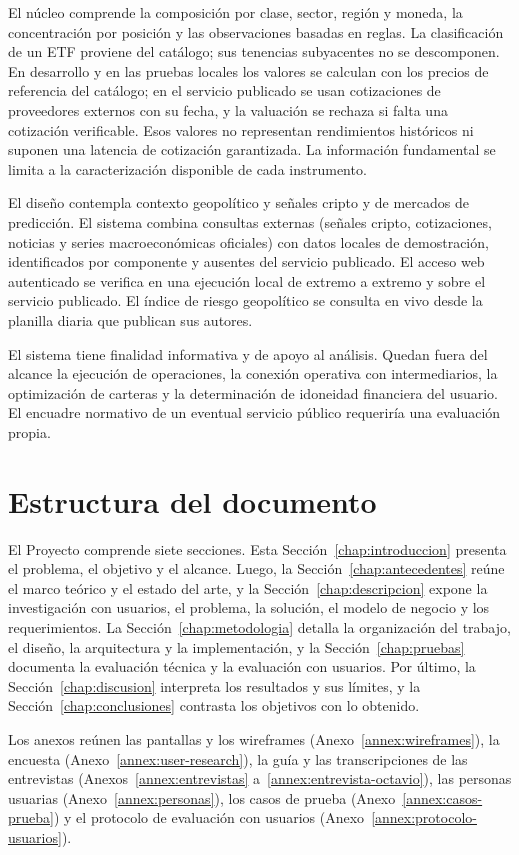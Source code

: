 El núcleo comprende la composición por clase, sector, región y moneda, la concentración por posición y las observaciones basadas en reglas. La clasificación de un ETF proviene del catálogo; sus tenencias subyacentes no se descomponen. En desarrollo y en las pruebas locales los valores se calculan con los precios de referencia del catálogo; en el servicio publicado se usan cotizaciones de proveedores externos con su fecha, y la valuación se rechaza si falta una cotización verificable. Esos valores no representan rendimientos históricos ni suponen una latencia de cotización garantizada. La información fundamental se limita a la caracterización disponible de cada instrumento.

El diseño contempla contexto geopolítico y señales cripto y de mercados de predicción. El sistema combina consultas externas (señales cripto, cotizaciones, noticias y series macroeconómicas oficiales) con datos locales de demostración, identificados por componente y ausentes del servicio publicado. El acceso web autenticado se verifica en una ejecución local de extremo a extremo y sobre el servicio publicado. El índice de riesgo geopolítico se consulta en vivo desde la planilla diaria que publican sus autores.

El sistema tiene finalidad informativa y de apoyo al análisis. Quedan fuera del alcance la ejecución de operaciones, la conexión operativa con intermediarios, la optimización de carteras y la determinación de idoneidad financiera del usuario. El encuadre normativo de un eventual servicio público requeriría una evaluación propia.

\section{Estructura del documento}\label{sec:estructura-documento}

El Proyecto comprende siete secciones. Esta Sección~\ref{chap:introduccion} presenta el problema, el objetivo y el alcance. Luego, la Sección~\ref{chap:antecedentes} reúne el marco teórico y el estado del arte, y la Sección~\ref{chap:descripcion} expone la investigación con usuarios, el problema, la solución, el modelo de negocio y los requerimientos. La Sección~\ref{chap:metodologia} detalla la organización del trabajo, el diseño, la arquitectura y la implementación, y la Sección~\ref{chap:pruebas} documenta la evaluación técnica y la evaluación con usuarios. Por último, la Sección~\ref{chap:discusion} interpreta los resultados y sus límites, y la Sección~\ref{chap:conclusiones} contrasta los objetivos con lo obtenido.

Los anexos reúnen las pantallas y los wireframes (Anexo~\ref{annex:wireframes}), la encuesta (Anexo~\ref{annex:user-research}), la guía y las transcripciones de las entrevistas (Anexos~\ref{annex:entrevistas} a~\ref{annex:entrevista-octavio}), las personas usuarias (Anexo~\ref{annex:personas}), los casos de prueba (Anexo~\ref{annex:casos-prueba}) y el protocolo de evaluación con usuarios (Anexo~\ref{annex:protocolo-usuarios}).
